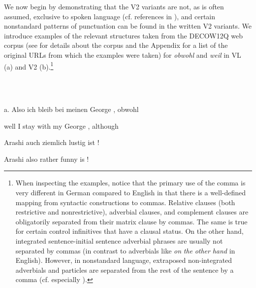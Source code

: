 \begin{styleMoutonTextBeforeExample}
We now begin by demonstrating that the V2 variants are not, as is often assumed, exclusive to spoken language (cf. references in ), and certain nonstandard patterns of punctuation can be found in the written V2 variants. We introduce examples of the relevant structures taken from the DECOW12Q web corpus (see  for details about the corpus and the Appendix for a list of the original URLs from which the examples were taken) for \textit{obwohl}  and \textit{weil}  in VL (a) and V2 (b).\footnote{When inspecting the examples, notice that the primary use of the comma is very different in German compared to English in that there is a well-defined mapping from syntactic constructions to commas. Relative clauses (both restrictive and nonrestrictive), adverbial clauses, and complement clauses are obligatorily separated from their matrix clause by commas. The same is true for certain control infinitives that have a clausal status. On the other hand, integrated sentence-initial sentence adverbial phrases are usually not separated by commas (in contrast to adverbials like \textit{on} \textit{the} \textit{other} \textit{hand} in English). However, in nonstandard language, extraposed non-integrated adverbials and particles are separated from the rest of the sentence by a comma (cf. especially ).}
\end{styleMoutonTextBeforeExample}

\begin{styleMoutonExample}
\ea%
    \label{ex:key:1}
    \gll\\
        \\
    \glt
    \z

          a.  Also  ich  bleib    bei  meinen  George  ,  obwohl
\end{styleMoutonExample}

\begin{styleMoutonExampleAlphaGloss}
well  I  stay    with  my    George  ,  although
\end{styleMoutonExampleAlphaGloss}

\begin{styleMoutonExampleAlphaGloss}
Arashi  auch    ziemlich  lustig    ist  !
\end{styleMoutonExampleAlphaGloss}

\begin{styleMoutonExampleAlphaGloss}
Arashi  also    rather    funny    is  !
\end{styleMoutonExampleAlphaGloss}

